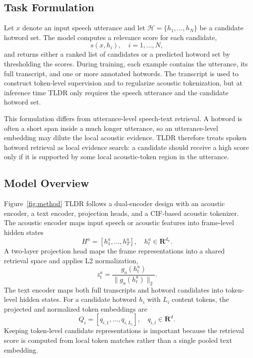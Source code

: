 \documentclass[letterpaper]{article} %
\begin{document}
\subsection{Task Formulation}

Let $x$ denote an input speech utterance and let $\mathcal{H}=\{h_1,\ldots,h_N\}$ be a candidate hotword set. The model computes a relevance score for each candidate,
\begin{equation}
	s(x,h_i), \quad i=1,\ldots,N,
\end{equation}
and returns either a ranked list of candidates or a predicted hotword set by thresholding the scores. During training, each example contains the utterance, its full transcript, and one or more annotated hotwords. The transcript is used to construct token-level supervision and to regularize acoustic tokenization, but at inference time TLDR only requires the speech utterance and the candidate hotword set.

This formulation differs from utterance-level speech-text retrieval. A hotword is often a short span inside a much longer utterance, so an utterance-level embedding may dilute the local acoustic evidence. TLDR therefore treats spoken hotword retrieval as local evidence search: a candidate should receive a high score only if it is supported by some local acoustic-token region in the utterance.

\subsection{Model Overview}



Figure~\ref{fig:method}  TLDR follows a dual-encoder design with an acoustic encoder, a text encoder, projection heads, and a CIF-based acoustic tokenizer. The acoustic encoder maps input speech or acoustic features into frame-level hidden states
\begin{equation}
	H^a=[h^a_1,\ldots,h^a_T], \quad h^a_t \in \mathbf{R}^{d_a}.
\end{equation}
A two-layer projection head maps the frame representations into a shared retrieval space and applies L2 normalization,
\begin{equation}
	z^a_t = \frac{g_a(h^a_t)}{\|g_a(h^a_t)\|_2}.
\end{equation}
The text encoder maps both full transcripts and hotword candidates into token-level hidden states. For a candidate hotword $h_i$ with $L_i$ content tokens, the projected and normalized token embeddings are
\begin{equation}
	Q_i=[q_{i,1},\ldots,q_{i,L_i}], \quad q_{i,l} \in \mathbf{R}^{d}.
\end{equation}
Keeping token-level candidate representations is important because the retrieval score is computed from local token matches rather than a single pooled text embedding.
\end{document}

